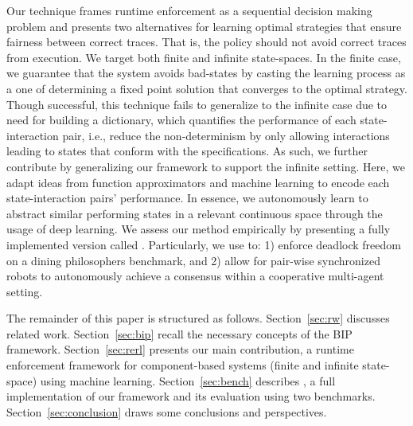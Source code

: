 Our technique frames runtime enforcement as a sequential decision making problem and presents two alternatives for learning optimal strategies that ensure fairness between correct traces. 
%
That is, the policy should not avoid correct traces from execution. 
%
We target both finite and infinite state-spaces. In the finite case, we guarantee that the system avoids bad-states by casting the learning process as a one of determining a fixed point solution that converges to the optimal strategy. Though successful, this technique fails to generalize to the infinite case due to need for building a dictionary, which quantifies the performance of each state-interaction pair, i.e., reduce the non-determinism by only allowing interactions leading to states that conform with the specifications. As such, we further contribute by generalizing our framework to support the infinite setting. Here, we adapt ideas from function approximators and machine learning to encode each state-interaction pairs' performance. In essence, we autonomously learn to abstract similar performing states in a relevant continuous space through the usage of deep learning. 
%
We assess our method empirically by presenting a fully implemented version called \rerl. Particularly, we use \rerl to: 1) enforce deadlock freedom on a dining philosophers benchmark, and 2) allow for pair-wise synchronized robots to autonomously achieve a consensus within a cooperative multi-agent setting. 


The remainder of this paper is structured as follows. Section~\ref{sec:rw} discusses related work. Section~\ref{sec:bip} recall the necessary concepts of the BIP framework. Section~\ref{sec:rerl} presents our main contribution, a runtime enforcement framework for component-based systems (finite and infinite state-space) using machine learning. Section~\ref{sec:bench} describes \rerl, a full implementation
of our framework and its evaluation using two benchmarks. Section~\ref{sec:conclusion} draws
some conclusions and perspectives.